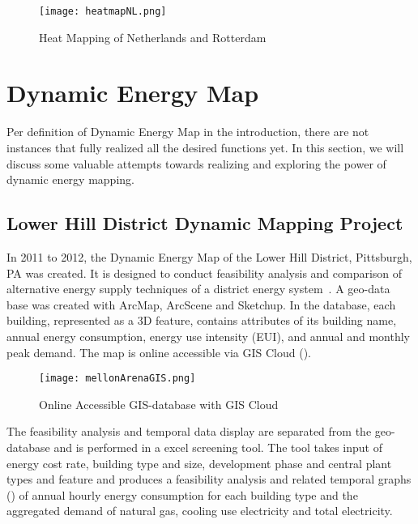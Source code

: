 \begin{figure}[htbp]
  \centering
  \texttt{[image: heatmapNL.png]}
  \caption[Rotterdam Heat Map]{Heat Mapping of Netherlands and
    Rotterdam~\cite{Dobbelsteen2013}}
  \label{fig:heatmapNL}
\end{figure}

\section{Dynamic Energy Map}\label{dynamicMap}
Per definition of Dynamic Energy Map in the introduction, there are
not instances that fully realized all the desired functions yet. In
this section, we will discuss some valuable attempts towards realizing
and exploring the power of dynamic energy mapping.

\subsection{Lower Hill District Dynamic Mapping Project}
In 2011 to 2012, the Dynamic Energy Map of the Lower Hill District,
Pittsburgh, PA was created. It is designed to conduct feasibility
analysis and comparison of alternative energy supply techniques of a
district energy system~\cite{baird2014, Ramesh2013}. A geo-data base
was created with ArcMap, ArcScene and Sketchup. In the database, each
building, represented as a 3D feature, contains attributes of its
building name, annual energy consumption, energy use intensity (EUI),
and annual and monthly peak demand. The map is online accessible via
GIS Cloud ().

\begin{figure}[h!]
  \centering
  \texttt{[image: mellonArenaGIS.png]}
  \caption[Lower Hill District 3D GIS Map]{Online Accessible GIS-database with GIS
    Cloud~\cite{baird2014, Ramesh2013}}
  \label{fig:mellonArenaGIS}
\end{figure}

The feasibility analysis and temporal data display are separated from
the geo-database and is performed in a excel screening tool. The tool
takes input of energy cost rate, building type and size, development
phase and central plant types and feature and produces a feasibility
analysis and related temporal graphs () of annual
hourly energy consumption for each building type and the aggregated
demand of natural gas, cooling use electricity and total electricity.

